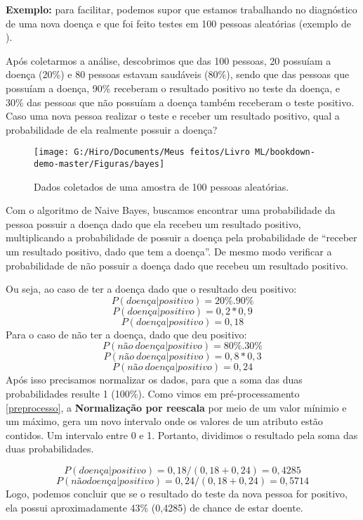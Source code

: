 \documentclass[
]{book}
\begin{document}
\textbf{Exemplo:} para facilitar, podemos supor que estamos trabalhando no diagnóstico de uma nova doença e que foi feito testes em 100 pessoas aleatórias (exemplo de \citet{organica}).

Após coletarmos a análise, descobrimos que das 100 pessoas, 20 possuíam a doença (20\%) e 80 pessoas estavam saudáveis (80\%), sendo que das pessoas que possuíam a doença, 90\% receberam o resultado positivo no teste da doença, e 30\% das pessoas que não possuíam a doença também receberam o teste positivo. Caso uma nova pessoa realizar o teste e receber um resultado positivo, qual a probabilidade de ela realmente possuir a doença?

\begin{figure}

{\centering \texttt{[image: G:/Hiro/Documents/Meus feitos/Livro ML/bookdown-demo-master/Figuras/bayes]} 

}

\caption{Dados coletados de uma amostra de 100 pessoas aleatórias.}\label{fig:bayes}
\end{figure}



Com o algoritmo de Naive Bayes, buscamos encontrar uma probabilidade da pessoa possuir a doença dado que ela recebeu um resultado positivo, multiplicando a probabilidade de possuir a doença pela probabilidade de ``receber um resultado positivo, dado que tem a doença''. De mesmo modo verificar a probabilidade de não possuir a doença dado que recebeu um resultado positivo.

Ou seja, ao caso de ter a doença dado que o resultado deu positivo:
\[P(doença|positivo) = 20\% . 90\% \] \[P(doença|positivo) = 0,2 * 0,9 \] \[P(doença|positivo) = 0,18\]
Para o caso de não ter a doença, dado que deu positivo:
\[P(não \ doença|positivo) = 80\%.30\%\]
\[P(não \ doença|positivo) = 0,8 * 0,3\]
\[P(não\ doença|positivo) = 0,24\]
Após isso precisamos normalizar os dados, para que a soma das duas probabilidades resulte 1 (100\%). Como vimos em pré-processamento \ref{preprocesso}, a \textbf{Normalização por reescala} por meio de um valor mínimio e um máximo, gera um novo intervalo onde os valores de um atributo estão contidos. Um intervalo entre 0 e 1. Portanto, dividimos o resultado pela soma das duas probabilidades.

\[P(doença|positivo) = 0,18/(0,18+0,24) = 0,4285\]
\[P(não doença|positivo) = 0,24/(0,18+0,24) = 0,5714\]
Logo, podemos concluir que se o resultado do teste da nova pessoa for positivo, ela possui aproximadamente 43\% (0,4285) de chance de estar doente.
\end{document}

